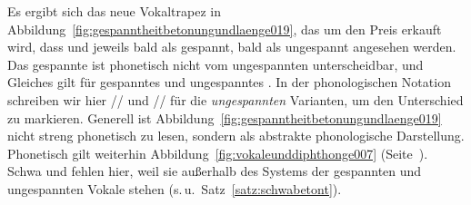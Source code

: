 Es ergibt sich das neue Vokaltrapez in Abbildung~\ref{fig:gespanntheitbetonungundlaenge019}, das um den Preis erkauft wird, dass \textipa{[E]} und \textipa{[a]} jeweils bald als gespannt, bald als ungespannt angesehen werden.
Das gespannte \textipa{[a]} ist phonetisch nicht vom ungespannten \textipa{[a]} unterscheidbar, und Gleiches gilt für gespanntes und ungespanntes \textipa{[E]}.
In der phonologischen Notation schreiben wir hier // und // für die \textit{ungespannten} Varianten, um den Unterschied zu markieren.
Generell ist Abbildung~\ref{fig:gespanntheitbetonungundlaenge019} nicht streng phonetisch zu lesen, sondern als abstrakte phonologische Darstellung.
Phonetisch gilt weiterhin Abbildung~\ref{fig:vokaleunddiphthonge007} (Seite~\pageref{fig:vokaleunddiphthonge007}).
Schwa und \textipa{[5]} fehlen hier, weil sie außerhalb des Systems der gespannten und ungespannten Vokale stehen (s.\,u.\ Satz~\ref{satz:schwabetont}).

